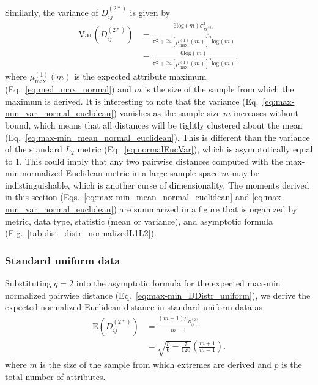 \documentclass[10pt,letterpaper]{article}
\begin{document}
Similarly, the variance of $D^{(2*)}_{ij}$ is given by
%
\begin{equation}\label{eq:max-min_var_normal_euclidean}
\begin{aligned}
\text{Var}\left(D^{(2*)}_{ij}\right) &= \frac{6\text{log}(m)\sigma^2_{D^{(2)}_{ij}}}{\pi^2 + 24\left[\mu^{(1)}_\text{max}(m)\right]^2\text{log}(m)} \\
&= \frac{6\text{log}(m)}{\pi^2 + 24\left[\mu^{(1)}_\text{max}(m)\right]^2\text{log}(m)},
\end{aligned}
\end{equation}
%
where $\mu^{(1)}_\text{max}(m)$ is the expected attribute maximum (Eq.~\ref{eq:med_max_normal}) and $m$ is the size of the sample from which the maximum is derived. It is interesting to note that the variance (Eq.~\ref{eq:max-min_var_normal_euclidean}) vanishes as the sample size $m$ increases without bound, which means that all distances will be tightly clustered about the mean (Eq.~\ref{eq:max-min_mean_normal_euclidean}). This is different than the variance of the standard $L_2$ metric (Eq.~\ref{eq:normalEucVar}), which is asymptotically equal to 1. This could imply that any two pairwise distances computed with the max-min normalized Euclidean metric in a large sample space $m$ may be indistinguishable, which is another curse of dimensionality. The moments derived in this section (Eqs.~\ref{eq:max-min_mean_normal_euclidean} and \ref{eq:max-min_var_normal_euclidean}) are summarized in a figure that is organized by metric, data type, statistic (mean or variance), and asymptotic formula (Fig.~\ref{tab:dist_distr_normalizedL1L2}).

\subsubsection*{Standard uniform data}

Substituting $q=2$ into the asymptotic formula for the expected max-min normalized pairwise distance (Eq.~\ref{eq:max-min_DDistr_uniform}), we derive the expected normalized Euclidean distance in standard uniform data as
%
\begin{equation}\label{eq:max-min_mean_uniform_euclidean}
\begin{aligned}
\text{E}\left(D^{(2*)}_{ij}\right) &= \frac{(m+1)\mu_{D^{(2)}_{ij}}}{m-1} \\
&= \sqrt{\frac{p}{6} - \frac{7}{120}}\left(\frac{m+1}{m-1}\right).
\end{aligned}
\end{equation}
%
where $m$ is the size of the sample from which extremes are derived and $p$ is the total number of attributes.
\end{document}
